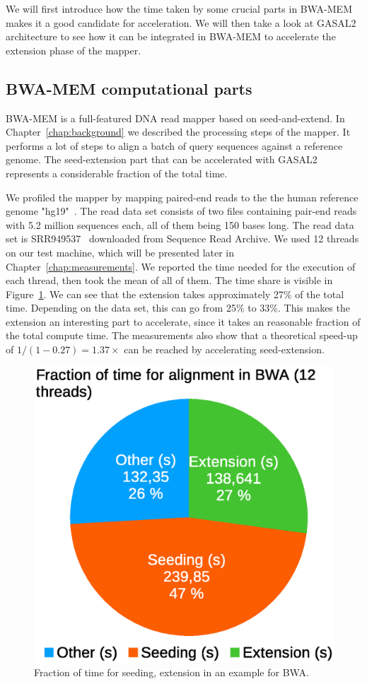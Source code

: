 

We will first introduce how the time taken by some crucial parts in BWA-MEM makes it a good candidate for acceleration. We will then take a look at GASAL2 architecture to see how it can be integrated in BWA-MEM to accelerate the extension phase of the mapper.


\subsection{BWA-MEM computational parts}

BWA-MEM is a full-featured DNA read mapper based on seed-and-extend. In Chapter~\ref{chap:background} we described the processing steps of the mapper. It performs a lot of steps to align a batch of query sequences against a reference genome. The seed-extension part that can be accelerated with GASAL2 represents a considerable fraction of the total time.

We profiled the mapper by mapping paired-end reads to the the human reference genome "hg19"~\cite{ncbi:hg19}. The read data set consists of two files containing pair-end reads with 5.2 million sequences each, all of them being 150 bases long. The read data set is SRR949537~\cite{ncbi:srr150} downloaded from Sequence Read Archive. We used 12 threads on our test machine, which will be presented later in Chapter~\ref{chap:measurements}. We reported the time needed for the execution of each thread, then took the mean of all of them. The time share is visible in Figure~\ref{fig:bwatimedivision}. We can see that the extension takes approximately 27\% of the total time. Depending on the data set, this can go from 25\% to 33\%. This makes the extension an interesting part to accelerate, since it takes an reasonable fraction of the total compute time. The measurements also show that a theoretical speed-up of $1/\left(1 - 0.27\right) = 1.37\times$ can be reached by accelerating seed-extension.

\begin{figure}[h!]
	\centering
	\includegraphics[width=0.65\linewidth]{bwa_time_division}
	\caption{Fraction of time for seeding, extension in an example for BWA.}
	\label{fig:bwatimedivision}
\end{figure}


